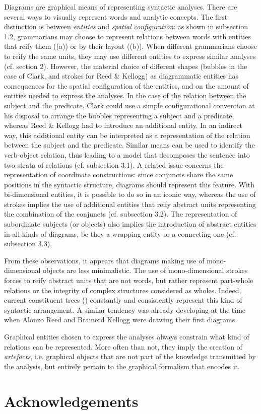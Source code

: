 \documentclass[output=paper]{langsci/langscibook}
\begin{document}
Diagrams are graphical means of representing syntactic analyses. There are several ways to visually represent words and analytic concepts. The first distinction is between \textit{entities} and \textit{spatial} \textit{configuration}: as shown in subsection 1.2, grammarians may choose to represent relations between words with entities that reify them ((a)) or by their layout ((b)). When different grammarians choose to reify the same units, they may use different entities to express similar analyses (cf. section 2). However, the material choice of different shapes (bubbles in the case of Clark, and strokes for Reed \& Kellogg) as diagrammatic entities has consequences for the spatial configuration of the entities, and on the amount of entities needed to express the analyses. In the case of the relation between the subject and the predicate, Clark could use a simple configurational convention at his disposal to arrange the bubbles representing a subject and a predicate, whereas Reed \& Kellogg had to introduce an additional entity. In an indirect way, this additional entity can be interpreted as a representation of the relation between the subject and the predicate. Similar means can be used to identify the verb-object relation, thus leading to a model that decomposes the sentence into two strata of relations (cf. subsection 3.1). A related issue concerns the representation of coordinate constructions: since conjuncts share the same positions in the syntactic structure, diagrams should represent this feature. With bi-dimensional entities, it is possible to do so in an iconic way, whereas the use of strokes implies the use of additional entities that reify abstract units representing the combination of the conjuncts (cf. subsection 3.2). The representation of subordinate subjects (or objects) also implies the introduction of abstract entities in all kinds of diagrams, be they a wrapping entity or a connecting one (cf. subsection 3.3). 

From these observations, it appears that diagrams making use of mono-dimensional objects are less minimalistic. The use of mono-dimensional strokes forces to reify abstract units that are not words, but rather represent part-whole relations or the integrity of complex structures considered as wholes. Indeed, current constituent trees () constantly and consistently represent this kind of syntactic arrangement. A similar tendency was already developing at the time when Alonzo Reed and Brainerd Kellogg were drawing their first diagrams.

Graphical entities chosen to express the analyses always constrain what kind of relations can be represented. More often than not, they imply the creation of \textit{artefacts}, i.e. graphical objects that are not part of the knowledge transmitted by the analysis, but entirely pertain to the graphical formalism that encodes it.

\section*{Acknowledgements}

{\sloppy\printbibliography[heading=subbibliography,notkeyword=this]}
\end{document}
